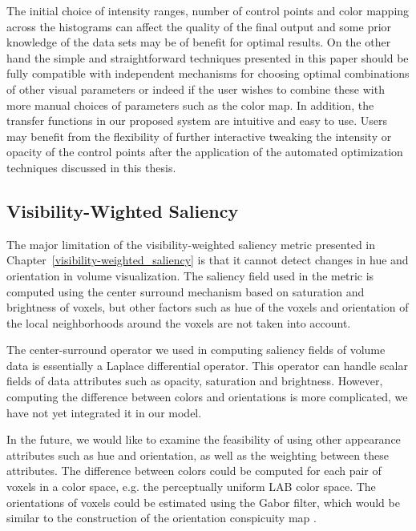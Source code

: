 The initial choice of intensity ranges, number of control points and color mapping across the histograms can affect the quality of the final output and some prior knowledge of the data sets may be of benefit for optimal results. On the other hand the simple and straightforward techniques presented in this paper should be fully compatible with independent mechanisms for choosing optimal combinations of other visual parameters or indeed if the user wishes to combine these with more manual choices of parameters such as the color map.
In addition, the transfer functions in our proposed system are intuitive and easy to use. Users may benefit from the flexibility of further interactive tweaking the intensity or opacity of the control points after the application of the automated optimization techniques discussed in this thesis.

\subsection{Visibility-Wighted Saliency}
The major limitation of the visibility-weighted saliency metric presented in Chapter~\ref{visibility-weighted_saliency} is that it cannot detect changes in hue and orientation in volume visualization. The saliency field used in the metric is computed using the center surround mechanism based on saturation and brightness of voxels, but other factors such as hue of the voxels and orientation of the local neighborhoods around the voxels are not taken into account.

The center-surround operator \cite{kim_saliency-guided_2006} we used in computing saliency fields of volume data is essentially a Laplace differential operator. This operator can handle scalar fields of data attributes such as opacity, saturation and brightness. However, computing the difference between colors and orientations is more complicated, we have not yet integrated it in our model.

In the future, we would like to examine the feasibility of using other appearance attributes such as hue and orientation, as well as the weighting between these attributes. The difference between colors could be computed for each pair of voxels in a color space, e.g. the perceptually uniform LAB color space. The orientations of voxels could be estimated using the Gabor filter, which would be similar to the construction of the orientation conspicuity map \cite{itti_model_1998}.

